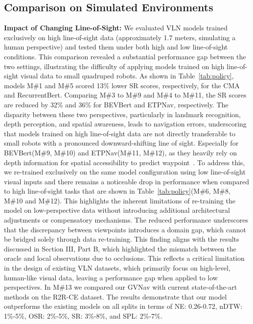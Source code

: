 \subsection{Comparison on Simulated Environments}
\noindent\textbf{Impact of Changing Line-of-Sight:} We evaluated VLN models trained exclusively on high line-of-sight data (approximately 1.7 meters, simulating a human perspective) and tested them under both high and low line-of-sight conditions. This comparison revealed a substantial performance gap between the two settings, illustrating the difficulty of applying models trained on high line-of-sight visual data to small quadruped robots. As shown in Table~\ref{tab:policy}, models M\#1 and M\#5 scored 13\% lower SR scores, respectively, for the CMA and RecurrentBert. Comparing M\#3 to M\#9 and M\#4 to M\#11, the SR scores are reduced by 32\% and 36\% for BEVBert and ETPNav, respectively. The disparity between these two perspectives, particularly in landmark recognition, depth perception, and spatial awareness, leads to navigation errors, underscoring that models trained on high line-of-sight data are not directly transferable to small robots with a pronounced downward-shifting line of sight. Especially for BEVBert(M\#9, M\#10) and ETPNav(M\#11, M\#12), as they heavily rely on depth information for spatial accessibility to predict waypoint~\cite{an2023etpnav, an2022bevbert}. To address this, we re-trained exclusively on the same model configuration using low line-of-sight visual inputs and there remains a noticeable drop in performance when compared to high line-of-sight tasks that are shown in Table~\ref{tab:policy}(M\#6, M\#8, M\#10 and M\#12). This highlights the inherent limitations of re-training the model on low-perspective data without introducing additional architectural adjustments or compensatory mechanisms. The reduced performance underscores that the discrepancy between viewpoints introduces a domain gap, which cannot be bridged solely through data re-training. This finding aligns with the results discussed in Section III, Part B, which highlighted the mismatch between the oracle and local observations due to occlusions. This reflects a critical limitation in the design of existing VLN datasets, which primarily focus on high-level, human-like visual data, leaving a performance gap when applied to low perspectives. In M\#13 we compared our GVNav with current state-of-the-art methods on the R2R-CE dataset. The results demonstrate that our model outperforms the existing models on all splits in terms of NE: 0.26-0.72, nDTW: 1\%-5\%, OSR: 2\%-5\%, SR: 3\%-8\%, and SPL: 2\%-7\%. 

